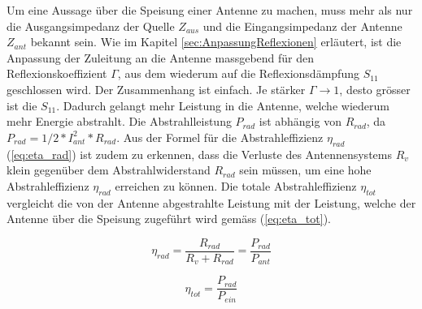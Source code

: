 Um eine Aussage über die Speisung einer Antenne zu machen, muss mehr als nur die Ausgangsimpedanz der Quelle $Z_{aus}$ und die Eingangsimpedanz der Antenne $Z_{ant}$ bekannt sein.  Wie im Kapitel \ref{sec:AnpassungReflexionen} erläutert, ist die Anpassung der Zuleitung an die Antenne massgebend für den Reflexionskoeffizient $\Gamma$, aus dem wiederum auf die Reflexionsdämpfung $S_{11}$ geschlossen wird. Der Zusammenhang ist einfach. Je stärker $\Gamma\rightarrow 1$, desto grösser ist die $S_{11}$. Dadurch gelangt mehr Leistung in die Antenne, welche wiederum mehr Energie abstrahlt. Die Abstrahlleistung $P_{rad}$ ist abhängig von $R_{rad}$, da $P_{rad}=1/2*I_{ant}^2*R_{rad}$. Aus der Formel für die Abstrahleffizienz $\eta_{rad}$ (\ref{eq:eta_rad}) ist zudem zu erkennen, dass die Verluste des Antennensystems $R_v$ klein gegenüber dem Abstrahlwiderstand $R_{rad}$ sein müssen, um eine hohe Abstrahleffizienz $\eta_{rad}$ erreichen zu können. 
Die totale Abstrahleffizienz $\eta_{tot}$ vergleicht die von der Antenne abgestrahlte Leistung mit der Leistung, welche der Antenne über die Speisung zugeführt wird gemäss (\ref{eq:eta_tot}).

\begin{equation}
\eta_{rad}=\dfrac{R_{rad}}{R_v + R_{rad}}=\dfrac{P_{rad}}{P_{ant}}
\label{eq:eta_rad}
\end{equation}

\begin{equation}
\eta_{tot}=\dfrac{P_{rad}}{P_{ein}}
\label{eq:eta_tot}
\end{equation}

